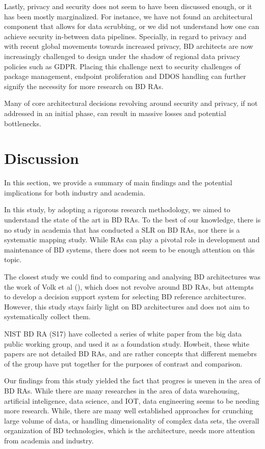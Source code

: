 \documentclass[review]{elsarticle}
\begin{document}
Lastly, privacy and security does not seem to have been discussed enough, or it has been mostly marginalized. For instance, we have not found an architectural component that allows for data scrubbing, or we did not understand how one can achieve security in-between data pipelines. Specially, in regard to privacy and with recent global movements towards increased privacy, BD architects are now increasingly challenged to design under the shadow of regional data privacy policies such as GDPR. Placing this challenge next to security challenges of package management, endpoint proliferation and DDOS handling can further signify the necessity for more research on BD RAs.

Many of core architectural decisions revolving around security and privacy, if not addressed in an initial phase, can result in massive losses and potential bottlenecks. 

\section{Discussion}

In this section, we provide a summary of main findings and the potential implications for both industry and academia. 

In this study, by adopting a rigorous research methodology, we aimed to understand the state of the art in BD RAs. To the best of our knowledge, there is no study in academia that has conducted a SLR on BD RAs, nor there is a systematic mapping study. While RAs can play a pivotal role in development and maintenance of BD systems, there does not seem to be enough attention on this topic. 

The closest study we could find to comparing and analysing BD architectures was the work of Volk et al (\cite{volk2019decision}), which does not revolve around BD RAs, but attempts to develop a decision support system for selecting BD reference architectures. However, this study stays fairly light on BD architectures and does not aim to systematically collect them. 

NIST BD RA (S17) have collected a series of white paper from the big data public working group, and used it as a foundation study. Howbeit, these white papers are not detailed BD RAs, and are rather concepts that different memebrs of the group have put together for the purposes of contrast and comparison. 

Our findings from this study yielded the fact that progres is uneven in the area of BD RAs. While there are many researches in the area of data warehousing, artificial inteligence, data science, and IOT, data engineering seems to be needing more research. While, there are many well established approaches for crunching large volume of data, or handling dimensionality of complex data sets, the overall organization of BD technologies, which is the architecture, needs more attention from academia and industry. 
\end{document}
